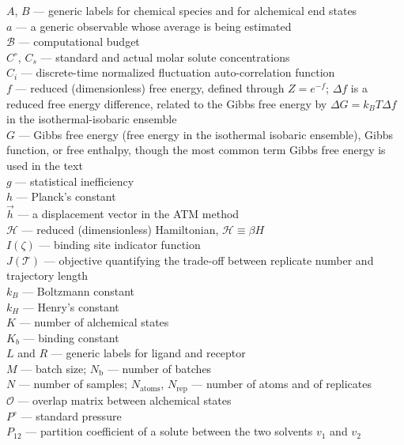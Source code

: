 \documentclass[9pt,bestpractices]{livecoms}
\begin{document}
\begin{tcolorbox}[title=List of Symbols, colback=green!10!white, breakable]
$A$, $B$ --- generic labels for chemical species and for alchemical end states\\
$a$ --- a generic observable whose average is being estimated\\
$\mathcal{B}$ --- computational budget\\
$C^{\circ}$, $C_s$ --- standard and actual molar solute concentrations \\
$C_i$ --- discrete-time normalized fluctuation auto-correlation function\\
$f$ --- reduced (dimensionless) free energy, defined through $Z = e^{-f}$; $\Delta f$ is a reduced free energy difference, related to the Gibbs free energy by $\Delta G = k_B T \Delta f$ in the isothermal-isobaric ensemble\\
$G$ --- Gibbs free energy (free energy in the isothermal isobaric ensemble), Gibbs function, or free enthalpy, though the most common term Gibbs free energy is used in the text\\
$g$ --- statistical inefficiency\\
$h$ --- Planck's constant \\
$\vec{h}$ --- a displacement vector in the ATM method \\
$\mathcal{H}$ --- reduced (dimensionless) Hamiltonian, $\mathcal{H} \equiv \beta H$\\
$I(\zeta)$ --- binding site indicator function\\
$J(\mathcal{T})$ --- objective quantifying the trade-off between replicate number and trajectory length\\
$k_B$ --- Boltzmann constant \\
$k_H$ --- Henry's constant \\
$K$ --- number of alchemical states\\
$K_b$ --- binding  constant \\
$L$ and $R$ --- generic labels for ligand and receptor\\
$M$ --- batch size; $N_{\mathrm{b}}$ --- number of batches\\
$N$ --- number of samples; $N_{\mathrm{atoms}}$, $N_{\mathrm{rep}}$ --- number of atoms and of replicates\\
$\mathcal{O}$ --- overlap matrix between alchemical states\\
$P^{\circ}$ --- standard pressure \\
$P_{12}$ --- partition coefficient of a solute between the two solvents $v_1$ and $v_2$\\

\end{tcolorbox}
\end{document}
